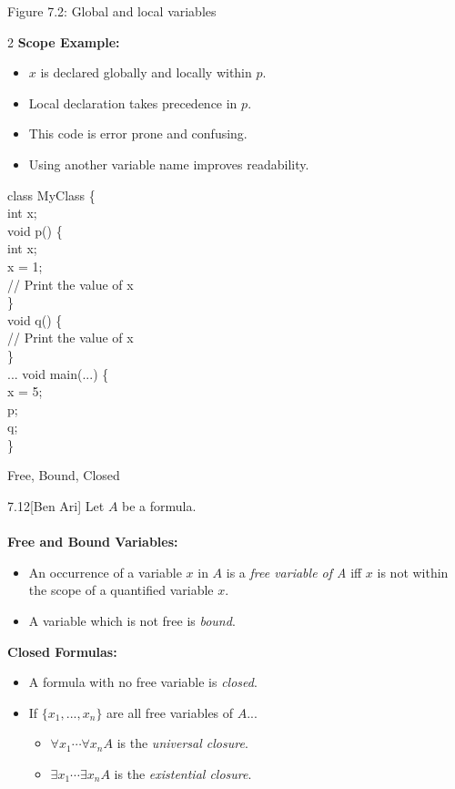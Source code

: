 \begin{wideslide}[bm=,toc=]{Figure 7.2: Global and local variables}
\begin{multicols}{2}
\textbf{Scope Example:}
\begin{itemize}
\item $x$ is declared globally and locally within $p$.
\item Local declaration takes precedence in $p$.
\item This code is error prone and confusing.
\item Using another variable name improves readability.
\end{itemize}
\vspace*{-2ex}
\begin{program}
class MyClass \{\\
\>int x;\\
\>void p() \{\\
\>\>int x;\\
\>\>x = 1;\\
\>\>// Print the value of x\\
\>\}\\
\>void q() \{\\
\>\>// Print the value of x\\
\>\}\\
\>... void main(...) \{\\
\>x = 5;\\
\>p;\\
\>q;\\
\}
\end{program}
\end{multicols}
\end{wideslide}

\begin{wideslide}[bm=,toc=]{Free, Bound, Closed}
\begin{defn}{7.12}[Ben Ari] Let $A$ be a formula.\\~\\
\pause
\textbf{Free and Bound Variables:}
\begin{itemize}
\item An occurrence of a variable $x$ in $A$ is a \emph{free variable of A}
iff $x$ is not within the scope of a quantified variable $x$.
\item A variable which is not free is \emph{bound}.
\end{itemize}
\end{defn}
\pause
\textbf{Closed Formulas:}
\begin{itemize}
\item<4-> A formula with no free variable is \emph{closed}.
\item<5-> If $\{x_1,...,x_n\}$ are all free variables of $A$...
  \begin{itemize}
      \item<6->$\forall x_1 \cdots \forall x_n A$ is the \emph{universal closure}.
      \item<7->$\exists x_1 \cdots \exists x_n A$ is the \emph{existential closure}.
  \end{itemize}
\end{itemize}
\vspace*{-2ex}
\end{wideslide}


